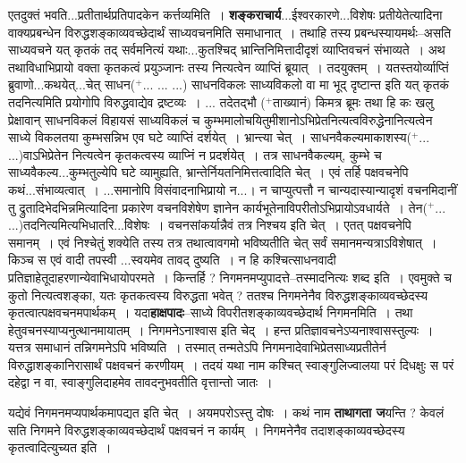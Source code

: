 \documentclass[article,12pt,a4paper]{memoir}
\newcommand{\add}[1]{($^{+}$#1)}
\begin{document}
	  \pstart एतदुक्तं भवति...प्रतीतार्थप्रतिपादकेन कर्त्तव्यमिति । \textbf{शङ्कराचार्य}...ईश्वरकारणे...विशेषः प्रतीयेतेत्यादिना वाक्यप्रबन्धेन विरुद्धशङ्काव्यवच्छेदार्थं साध्यवचनमिति समाधानात् । तथाहि तस्य प्रबन्धस्यायमर्थः--असति साध्यवचने यत् कृतकं तद् सर्वमनित्यं  \leavevmode{} यथाः...कुतश्चिद् भ्रान्तिनिमित्तादीदृशं व्याप्तिवचनं संभाव्यते । अथ तथाविधाभिप्रायो वक्ता कृतकत्वं प्रयुञ्जानः तस्य नित्यत्वेन व्याप्तिं ब्रूयात् । तदयुक्तम् । यतस्तयोर्व्याप्तिं ब्रुवाणो...कथयेत्...चेत् साधन\add{... ... ...} साधनविकलः साध्यविकलो वा मा भूद् दृष्टान्त इति यत् कृतकं तदनित्यमिति प्रयोगोपि विरुद्धवाद्येव द्रष्टव्यः । ... तदेतद्भौ \add{ताख्यानं} किमत्र ब्रूमः तथा हि कः खलु प्रेक्षावान् साधनविकलं विहायसं साध्यविकलं च कुम्भमालोचयितुमीशानोऽभिप्रेतनित्यत्वविरुद्धेनानित्यत्वेन साध्ये  विकलतया कुम्भसन्निभ एव घटे व्याप्तिं दर्शयेत् । भ्रान्त्या चेत् । साधनवैकल्यमाकाशस्य\add{... ...}वाऽभिप्रेतेन नित्यत्वेन कृतकत्वस्य व्याप्निं न प्रदर्शयेत् । तत्र साधनवैकल्यम्, कुम्भे च साध्यवैकल्य...कुम्भतुल्येपि घटे व्यामुह्यति, भ्रान्तेर्नियतनिमित्तत्वादिति चेत् । एवं तर्हि पक्षवचनेपि कथं...संभाव्यत्वात् । ...समानोपि विसंवादनाभिप्रायो न...। न चाप्युत्पत्तौ न चान्यदास्यान्यादृशं वचनमिदानीं तु द्रुतादिभेदभिन्नमित्यादिना प्रकारेण वचनविशेषेण ज्ञानेन कार्यभूतेनाविपरीतोऽभिप्रायोऽवधार्यते । तेन\add{... ...}तदनित्यमित्यभिधातरि...विशेषः । वचनसांकर्यान्नैवं तत्र निश्चय इति चेत् । एतत् पक्षवचनेपि समानम् । एवं निश्चेतुं शक्येति तस्य तत्र तथात्वावगमो भविष्यतीति चेत् सर्वं समानमन्यत्राऽविशेषात् । किञ्च स एवं वादी तपस्वी ...\leavevmode{}स्वयमेव तावद् दुष्यति । न हि कश्चित्साधनवादी प्रतिज्ञाहेतूदाहरणान्येवाभिधायोपरमते । किन्तर्हि ? निगमनमप्युपादत्ते--तस्मादनित्यः शब्द इति । एवमुक्ते च कुतो नित्यत्वशङ्का, यतः कृतकत्वस्य विरुद्धता भवेत् ? ततश्च निगमनेनैव विरुद्धशङ्काव्यवच्छेदस्य कृतत्वात्पक्षवचनमपार्थकम् । यदा\textbf{हाक्षपादः}--साध्ये विपरीतशङ्काव्यवच्छेदार्थ निगमनमिति । तथा हेतुवचनस्याप्यनुत्थानमायातम् । निगमनेऽनाश्वास इति चेद् । हन्त प्रतिज्ञावचनेऽप्यनाश्वासस्तुल्यः । यत्तत्र समाधानं तन्निगमनेऽपि भविष्यति । तस्मात् तन्मतेऽपि निगमनादेवाभिप्रेतसाध्यप्रतीतेर्न विरुद्धाशङ्कानिरासार्थं पक्षवचनं करणीयम् । तदयं यथा नाम कश्चित् स्वाङ्गुलिज्वालया परं दिधक्षुः स परं दहेद्वा न वा, स्वाङ्गुलिदाहमेव तावदनुभवतीति वृत्तान्तो जातः ।
	\pend
      

	  \pstart यद्येवं निगमनमप्यपार्थकमापद्यत इति चेत् । अयमपरोऽस्तु दोषः । कथं नाम \textbf{ताथागता ज}यन्ति ? केवलं सति निगमने विरुद्धशङ्काव्यवच्छेदार्थं पक्षवचनं न कार्यम् । निगमनेनैव तदाशङ्काव्यवच्छेदस्य कृतत्वादित्युच्यत इति ।
	\pend
      
\end{document}
